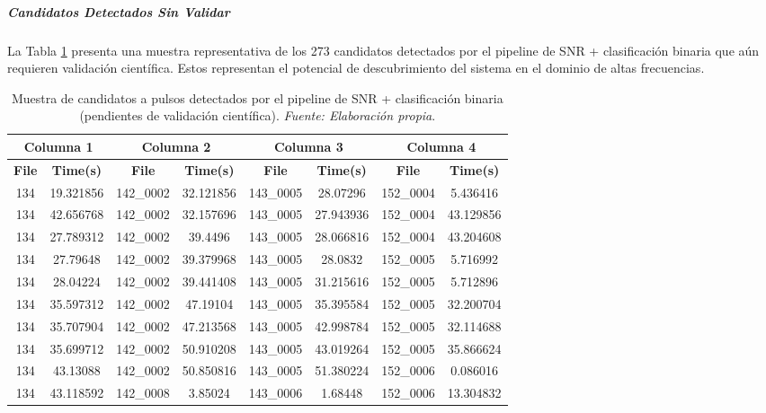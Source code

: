 \subparagraph{Candidatos Detectados Sin Validar}

La Tabla \ref{tab:alma_candidate_pulses} presenta una muestra representativa de los 273 candidatos detectados por el pipeline de SNR + clasificación binaria que aún requieren validación científica. Estos representan el potencial de descubrimiento del sistema en el dominio de altas frecuencias.

\begin{table}[H]
    \centering
    \caption{Muestra de candidatos a pulsos detectados por el pipeline de SNR + clasificación binaria (pendientes de validación científica). \textit{Fuente: Elaboración propia}.}
    \label{tab:alma_candidate_pulses}
    \begin{tabular}{|c|c|c|c|c|c|c|c|}
        \hline
        \multicolumn{2}{|c|}{\textbf{Columna 1}} & \multicolumn{2}{|c|}{\textbf{Columna 2}} & \multicolumn{2}{|c|}{\textbf{Columna 3}} & \multicolumn{2}{|c|}{\textbf{Columna 4}} \\
        \hline
        \textbf{File} & \textbf{Time(s)} & \textbf{File} & \textbf{Time(s)} & \textbf{File} & \textbf{Time(s)} & \textbf{File} & \textbf{Time(s)} \\
        \hline
        134 & 19.321856 & 142\_0002 & 32.121856 & 143\_0005 & 28.07296 & 152\_0004 & 5.436416 \\
        134 & 42.656768 & 142\_0002 & 32.157696 & 143\_0005 & 27.943936 & 152\_0004 & 43.129856 \\
        134 & 27.789312 & 142\_0002 & 39.4496 & 143\_0005 & 28.066816 & 152\_0004 & 43.204608 \\
        134 & 27.79648 & 142\_0002 & 39.379968 & 143\_0005 & 28.0832 & 152\_0005 & 5.716992 \\
        134 & 28.04224 & 142\_0002 & 39.441408 & 143\_0005 & 31.215616 & 152\_0005 & 5.712896 \\
        134 & 35.597312 & 142\_0002 & 47.19104 & 143\_0005 & 35.395584 & 152\_0005 & 32.200704 \\
        134 & 35.707904 & 142\_0002 & 47.213568 & 143\_0005 & 42.998784 & 152\_0005 & 32.114688 \\
        134 & 35.699712 & 142\_0002 & 50.910208 & 143\_0005 & 43.019264 & 152\_0005 & 35.866624 \\
        134 & 43.13088 & 142\_0002 & 50.850816 & 143\_0005 & 51.380224 & 152\_0006 & 0.086016 \\
        134 & 43.118592 & 142\_0008 & 3.85024 & 143\_0006 & 1.68448 & 152\_0006 & 13.304832 \\

\end{tabular}
\end{table}
